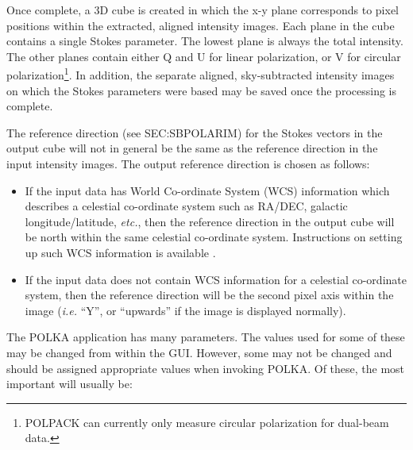 \documentclass[twoside,11pt]{starlink}
\begin{document}
Once complete, a 3D cube is created in which the x-y plane corresponds to
pixel positions within the extracted, aligned intensity images. Each
plane in the cube contains a single Stokes parameter. The lowest plane is
always the total intensity. The other planes contain either Q and U for
linear polarization, or V for circular polarization\footnote{POLPACK can
currently only measure circular polarization for dual-beam data.}. In
addition, the separate aligned, sky-subtracted intensity images on which
the Stokes parameters were based may be saved once the processing is
complete.

The reference direction (see 
{}{SEC:SBPOLARIM}) for the Stokes vectors in the output cube will
not in general be the same as the reference direction in the input
intensity images. The output reference direction is chosen as follows:

\begin{itemize}
\item If the input data has World Co-ordinate System (WCS) information
which describes a celestial co-ordinate system such as RA/DEC, galactic
longitude/latitude, \emph{etc.}, then the reference direction in the output cube
will be north within the same celestial co-ordinate system.
Instructions on setting up such WCS information is available
.

\item If the input data does not contain WCS information for a celestial
co-ordinate system, then the reference direction will be the second pixel
axis within the image (\emph{i.e.} ``Y'', or ``upwards'' if the image is
displayed normally).
\end{itemize}

The POLKA application has many parameters. The values used for some of
these may be changed from within the GUI. However, some may not be
changed and should be assigned appropriate values when invoking POLKA.
Of these, the most important will usually be:
\end{document}
